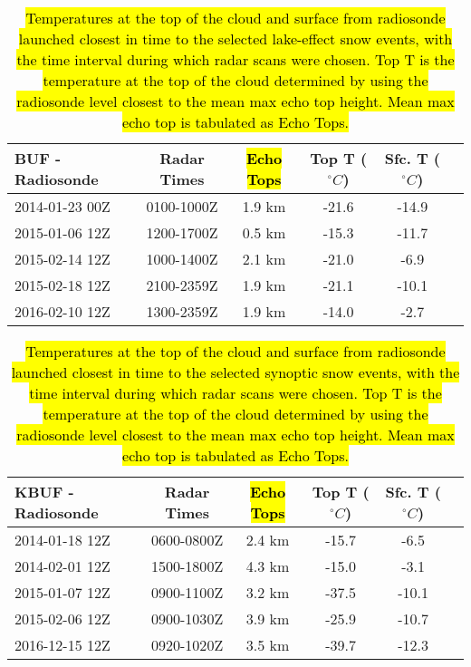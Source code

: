\begin{table}[H]
    \caption{\hl{Temperatures at the top of the cloud and surface from radiosonde launched closest in time to the selected lake-effect snow events, with the time interval during which radar scans were chosen. Top T is the temperature at the top of the cloud determined by using the radiosonde level closest to the mean max echo top height. Mean max echo top is tabulated as Echo Tops.}}\label{eventslake}
    \begin{center}
    \begin{tabular}{|l|c|c|c|c|c|}
    \hline
     BUF - Radiosonde & Radar Times & \hl{Echo Tops} & Top T ($^{\circ}C$) & Sfc. T ($^{\circ}C$)\\
    \hline\hline
    2014-01-23 00Z & 0100-1000Z & 1.9 km & -21.6 & -14.9 \\
    \hline
    2015-01-06 12Z & 1200-1700Z & 0.5 km & -15.3 & -11.7 \\
    \hline
    2015-02-14 12Z & 1000-1400Z & 2.1 km & -21.0 & -6.9 \\
    \hline
    2015-02-18 12Z & 2100-2359Z & 1.9 km & -21.1 & -10.1 \\
    \hline
    2016-02-10 12Z & 1300-2359Z & 1.9 km & -14.0 & -2.7 \\
    \hline
    \end{tabular}
    \end{center}
\end{table}

\begin{table}[H]
    \caption{\hl{Temperatures at the top of the cloud and surface from radiosonde launched closest in time to the selected synoptic snow events, with the time interval during which radar scans were chosen. Top T is the temperature at the top of the cloud determined by using the radiosonde level closest to the mean max echo top height. Mean max echo top is tabulated as Echo Tops.}}\label{synopticevents}
    \begin{center}
    \begin{tabular}{|l|c|c|c|c|c|}
    \hline
     KBUF - Radiosonde & Radar Times & \hl{Echo Tops} & Top T ($^{\circ}C$) & Sfc. T ($^{\circ}C$)\\
    \hline\hline
    2014-01-18 12Z & 0600-0800Z & 2.4 km & -15.7 & -6.5 \\
    \hline
    2014-02-01 12Z & 1500-1800Z & 4.3 km & -15.0 & -3.1 \\
    \hline
    2015-01-07 12Z & 0900-1100Z & 3.2 km & -37.5 & -10.1 \\
    \hline
    2015-02-06 12Z & 0900-1030Z & 3.9 km & -25.9 & -10.7 \\
    \hline
    2016-12-15 12Z & 0920-1020Z & 3.5 km & -39.7 & -12.3 \\
    \hline
    \end{tabular}
    \end{center}
\end{table}
